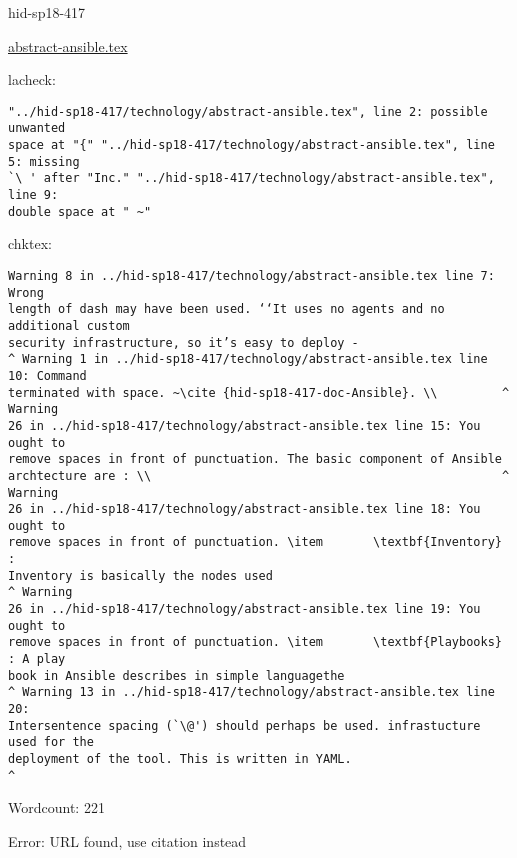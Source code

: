\begin{IU}

hid-sp18-417

\href{https://github.com/cloudmesh-community/hid-sp18-417/blob/master//technology/abstract-ansible.tex}{abstract-ansible.tex}

 
lacheck:
\begin{tiny}
\begin{verbatim}
"../hid-sp18-417/technology/abstract-ansible.tex", line 2: possible unwanted
space at "{" "../hid-sp18-417/technology/abstract-ansible.tex", line 5: missing
`\ ' after "Inc." "../hid-sp18-417/technology/abstract-ansible.tex", line 9:
double space at " ~"
\end{verbatim}
\end{tiny}
chktex:
\begin{tiny}
\begin{verbatim}
Warning 8 in ../hid-sp18-417/technology/abstract-ansible.tex line 7: Wrong
length of dash may have been used. ‘‘It uses no agents and no additional custom
security infrastructure, so it’s easy to deploy -
^ Warning 1 in ../hid-sp18-417/technology/abstract-ansible.tex line 10: Command
terminated with space. ~\cite {hid-sp18-417-doc-Ansible}. \\         ^ Warning
26 in ../hid-sp18-417/technology/abstract-ansible.tex line 15: You ought to
remove spaces in front of punctuation. The basic component of Ansible
archtecture are : \\                                                 ^ Warning
26 in ../hid-sp18-417/technology/abstract-ansible.tex line 18: You ought to
remove spaces in front of punctuation. \item       \textbf{Inventory} :
Inventory is basically the nodes used                                 ^ Warning
26 in ../hid-sp18-417/technology/abstract-ansible.tex line 19: You ought to
remove spaces in front of punctuation. \item       \textbf{Playbooks} : A play
book in Ansible describes in simple languagethe
^ Warning 13 in ../hid-sp18-417/technology/abstract-ansible.tex line 20:
Intersentence spacing (`\@') should perhaps be used. infrastucture used for the
deployment of the tool. This is written in YAML.
^
\end{verbatim}
\end{tiny}

Wordcount: 221

Error: URL found, use citation instead
\end{IU}

